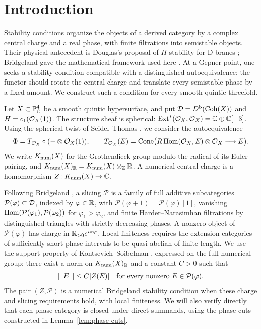 \section{Introduction}

Stability conditions organize the objects of a derived category by a complex
central charge and a real phase, with finite filtrations into semistable
objects. Their physical antecedent is Douglas's proposal of $\Pi$-stability
for D-branes \cite{Douglas2001}; Bridgeland gave the mathematical framework
used here \cite{Bridgeland2007}. At a Gepner point, one seeks a stability
condition compatible with a distinguished autoequivalence: the functor should
rotate the central charge and translate every semistable phase by a fixed
amount. We construct such a condition for every smooth quintic threefold.

Let $X\subset\mathbb P^4_{\mathbb C}$ be a smooth quintic hypersurface, and put
$\mathcal D=D^{\mathrm b}(\operatorname{Coh}(X))$ and $H=c_1(\mathcal O_X(1))$. The structure sheaf is spherical:
$\operatorname{Ext}^*(\mathcal O_X,\mathcal O_X)=\mathbb C\oplus\mathbb C[-3]$. Using the spherical twist of
Seidel--Thomas \cite{SeidelThomas2001}, we consider the autoequivalence
\[
 \Phi=T_{\mathcal O_X}\circ(-\otimes\mathcal O_X(1)),\qquad
 T_{\mathcal O_X}(E)=\operatorname{Cone}\bigl(
 R\operatorname{Hom}(\mathcal O_X,E)\otimes\mathcal O_X\longrightarrow E\bigr).
\]
We write $K_{\mathrm{num}}(X)$ for the Grothendieck group modulo the radical of its Euler
pairing, and $K_{\mathrm{num}}(X)_{\mathbb R}=K_{\mathrm{num}}(X)\otimes_{\mathbb Z}\mathbb R$.
A numerical central charge is a homomorphism $Z\colon K_{\mathrm{num}}(X)\to\mathbb C$.

Following Bridgeland \cite{Bridgeland2007}, a slicing $\mathcal P$ is a family
of full additive subcategories $\mathcal P(\varphi)\subset\mathcal D$, indexed by
$\varphi\in\mathbb R$, with
$\mathcal P(\varphi+1)=\mathcal P(\varphi)[1]$,
vanishing $\operatorname{Hom}(\mathcal P(\varphi_1),\mathcal P(\varphi_2))$ for
$\varphi_1>\varphi_2$, and finite Harder--Narasimhan filtrations by distinguished
triangles with strictly decreasing phases. A nonzero object of
$\mathcal P(\varphi)$ has charge in $\mathbb R_{>0}e^{i\pi\varphi}$. Local finiteness
requires the extension categories of sufficiently short phase intervals to be
quasi-abelian of finite length. We use the support property of
Kontsevich--Soibelman \cite[Section~1.2]{KontsevichSoibelman2008}, expressed on
the full numerical group: there exist a norm on $K_{\mathrm{num}}(X)_{\mathbb R}$ and a
constant $C>0$ such that
\[
 \left\lVert[E]\right\rVert\le C|Z(E)|
 \quad\text{for every nonzero }E\in\mathcal P(\varphi).
\]
The pair $(Z,\mathcal P)$ is a numerical Bridgeland stability condition when
these charge and slicing requirements hold, with local finiteness.
We will also verify directly that each phase category is closed under direct
summands, using the phase cuts constructed in Lemma~\ref{lem:phase-cuts}.

